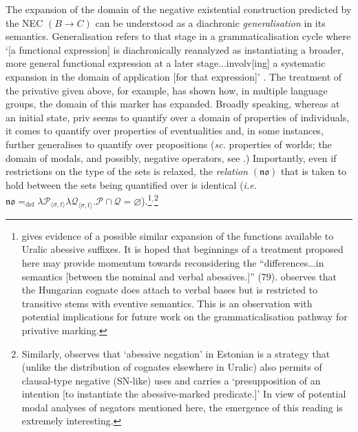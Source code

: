 \documentclass[usenames,dvipsnames,11pt]{article}
\begin{document}
{The expansion of the domain of the negative existential construction predicted by the NEC $(B\to C)$ can be understood as a diachronic \textit{generalisation} in its semantics. Generalisation refers to that stage in a grammaticalisation cycle where `[a functional expression] is diachronically reanalyzed as instantiating a broader, more general functional expression at a later stage...involv[ing] a systematic expansion in the domain of application [for that expression]' \citep[187]{Deo2015}. The treatment of the privative given above, for example, has shown how, in multiple language groups, the domain of this marker has expanded. Broadly speaking, whereas at an initial state, \gls{priv} seems to quantify over a domain of properties of individuals\iffalse$\langle\langle e,t\rangle ,\langle\langle e,t\rangle,t\rangle\rangle$\fi, it comes to quantify over properties of eventualities \iffalse$\langle\langle \mathcal\varepsilon ,t\rangle ,\langle\langle \varepsilon,t\rangle,t\rangle\rangle$\fi and, in some instances, further generalises to quantify over propositions  (\textit{sc.} properties of worlds; the domain of modals, and possibly, negative operators, see \citealt[34\textit{ff}]{Horn2017}.) Importantly, even if restrictions on the type of the sets is relaxed, the \textit{relation} $(\boldsymbol{\mathfrak{n\!o}})$ that is taken to hold between the sets being quantified over is identical (\textit{i.e.}~$\mathfrak{no}=_{\text{def}}\lambda \mathcal P_{\langle\sigma,t\rangle}\lambda \mathcal Q_{\langle\sigma,t\rangle}.\mathcal P\cap \mathcal Q=\varnothing$).\footnote{\citet{Hamari2011} gives evidence of a possible similar expansion of the functions available to Uralic abessive suffixes. It is hoped that beginnings of a treatment proposed here may provide momentum towards reconsidering the ``differences...in semantics [between the nominal and verbal abessives.]'' (79). \citet[609]{Kiefer2015} observes that the Hungarian cognate does attach to verbal bases but is restricted to transitive stems with eventive semantics. This is an observation with potential implications for future work on the grammaticalisation pathway for privative marking.}$^,$\footnote{\label{TammABE}Similarly, \citet[416]{Tamm2015} observes that `abessive negation' in Estonian is a strategy that (unlike the distribution of cognates elsewhere in Uralic) also permits of clausal-type negative (SN-like) uses and carries a `presupposition of an intention [to instantiate the abessive-marked predicate.]' In view of potential modal analyses of negators mentioned here, the emergence of this reading is extremely interesting.}%


}
\end{document}
